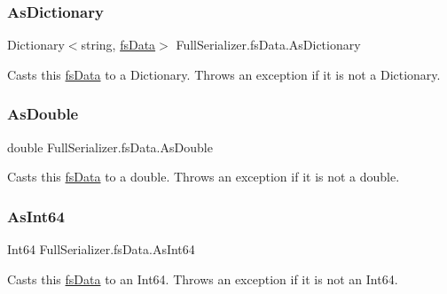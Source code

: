 \subsubsection{\texorpdfstring{As\+Dictionary}{AsDictionary}}
{\footnotesize\ttfamily Dictionary$<$string, \hyperlink{class_full_serializer_1_1fs_data}{fs\+Data}$>$ Full\+Serializer.\+fs\+Data.\+As\+Dictionary\hspace{0.3cm}{\ttfamily [get]}}



Casts this \hyperlink{class_full_serializer_1_1fs_data}{fs\+Data} to a Dictionary. Throws an exception if it is not a Dictionary. 

\mbox{\label{class_full_serializer_1_1fs_data_a3b742582f73e3eb166bcc6df88b2ffd9}} 
\subsubsection{\texorpdfstring{As\+Double}{AsDouble}}
{\footnotesize\ttfamily double Full\+Serializer.\+fs\+Data.\+As\+Double\hspace{0.3cm}{\ttfamily [get]}}



Casts this \hyperlink{class_full_serializer_1_1fs_data}{fs\+Data} to a double. Throws an exception if it is not a double. 

\mbox{\label{class_full_serializer_1_1fs_data_a47a5cdaefdb6afc7f2bdaa026befdc00}} 
\subsubsection{\texorpdfstring{As\+Int64}{AsInt64}}
{\footnotesize\ttfamily Int64 Full\+Serializer.\+fs\+Data.\+As\+Int64\hspace{0.3cm}{\ttfamily [get]}}



Casts this \hyperlink{class_full_serializer_1_1fs_data}{fs\+Data} to an Int64. Throws an exception if it is not an Int64. 

\mbox{\label{class_full_serializer_1_1fs_data_aebf459f479691aa88d9712f53a2d85ee}} 
